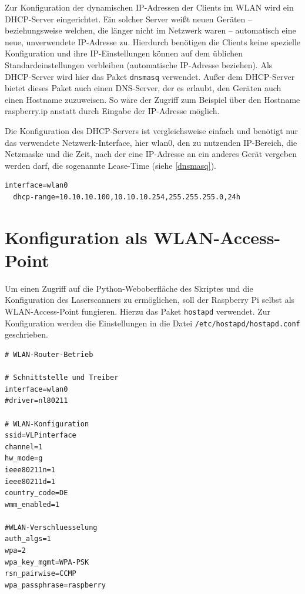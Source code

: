 \documentclass[a4paper,12pt,bibliography=totoc, listof=totoc,titlepage,pointlessnumbers]{scrreprt}
\newcommand{\code}[1]{\texttt{#1}}
\begin{document}
Zur Konfiguration der dynamischen IP-Adressen der Clients im WLAN wird ein DHCP-Server eingerichtet. Ein solcher Server weißt neuen Geräten -- beziehungsweise welchen, die länger nicht im Netzwerk waren -- automatisch eine neue, unverwendete IP-Adresse zu. Hierdurch benötigen die Clients keine spezielle Konfiguration und ihre IP-Einstellungen können auf dem üblichen Standardeinstellungen verbleiben (automatische IP-Adresse beziehen). Als DHCP-Server wird hier das Paket \code{dnsmasq} verwendet. Außer dem DHCP-Server bietet dieses Paket auch einen DNS-Server, der es erlaubt, den Geräten auch einen Hostname zuzuweisen. So wäre der Zugriff zum Beispiel über den Hostname raspberry.ip anstatt durch Eingabe der IP-Adresse möglich.

Die Konfiguration des DHCP-Servers ist vergleichsweise einfach und benötigt nur das verwendete Netzwerk-Interface, hier wlan0, den zu nutzenden IP-Bereich, die Netzmaske und die Zeit, nach der eine IP-Adresse an ein anderes Gerät vergeben werden darf, die sogenannte Lease-Time (siehe \autoref{dnsmasq}). \cite{accesspoint}

  
\begin{lstlisting}[caption={Konfiguration der \code{/etc/dnsmasq.conf}}, label={dnsmasq}]
interface=wlan0
  dhcp-range=10.10.10.100,10.10.10.254,255.255.255.0,24h
\end{lstlisting}

\section{Konfiguration als WLAN-Access-Point}
Um einen Zugriff auf die Python-Weboberfläche des Skriptes und die Konfiguration des Laserscanners zu ermöglichen, soll der Raspberry Pi selbst als WLAN-Access-Point fungieren. Hierzu das Paket \code{hostapd} verwendet. Zur Konfiguration werden die Einstellungen in die Datei \code{/etc/hostapd/hostapd.conf} geschrieben. \cite{accesspoint}

\begin{lstlisting}[caption={Konfiguration der \code{/etc/hostapd/hostapd.conf}}, label={hostapd}]
# WLAN-Router-Betrieb

# Schnittstelle und Treiber
interface=wlan0
#driver=nl80211

# WLAN-Konfiguration
ssid=VLPinterface
channel=1
hw_mode=g
ieee80211n=1
ieee80211d=1
country_code=DE
wmm_enabled=1

#WLAN-Verschluesselung
auth_algs=1
wpa=2
wpa_key_mgmt=WPA-PSK
rsn_pairwise=CCMP
wpa_passphrase=raspberry
\end{lstlisting}
\end{document}
